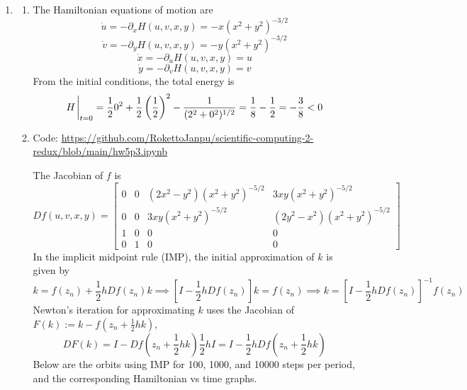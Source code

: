 \documentclass{article}
\newcommand{\br}[1]{\left(#1\right)}
\newcommand{\sbr}[1]{\left[#1\right]}
\newcommand{\m}[2][b]{\begin{#1matrix}#2\end{#1matrix}}
\newcommand{\inv}{^{-1}}
\newcommand{\imp}{\implies}
\newcommand{\ptl}{\partial}
\begin{document}
\begin{enumerate}
\begin{enumerate}
\end{enumerate}



\item

\begin{enumerate}[label=(\alph*)]
	
	\item The Hamiltonian equations of motion are
	$$\dot u = -\ptl_xH(u,v,x,y) = -x(x^2+y^2)^{-3/2}$$
	$$\dot v = -\ptl_yH(u,v,x,y) = -y(x^2+y^2)^{-3/2}$$
	$$\dot x = -\ptl_uH(u,v,x,y) = u$$
	$$\dot y = -\ptl_vH(u,v,x,y) = v$$
	From the initial conditions, the total energy is
	$$H\eval_{t=0} = \frac120^2 + \frac12\br{\frac12}^2 - \frac{1}{(2^2+0^2)^{1/2}} = \frac18 - \frac12 = -\frac38 < 0$$
	
	
	\item Code: \url{https://github.com/RokettoJanpu/scientific-computing-2-redux/blob/main/hw5p3.ipynb}
	
	The Jacobian of $f$ is
	$$Df(u,v,x,y) = \m{
		0 & 0 & (2x^2 - y^2)(x^2 + y^2)^{-5/2} & 3xy(x^2 + y^2)^{-5/2} \\
		0 & 0 & 3xy(x^2 + y^2)^{-5/2} & (2y^2 - x^2)(x^2 + y^2)^{-5/2} \\
		1 & 0 & 0 & 0\\
		0 & 1 & 0 & 0
	}$$
	In the implicit midpoint rule (IMP), the initial approximation of $k$ is given by
	$$k = f(z_n) + \frac12hDf(z_n)k
	\imp \sbr{I - \frac12hDf(z_n)}k = f(z_n)
	\imp k = \sbr{I - \frac12hDf(z_n)}\inv f(z_n)$$
	Newton's iteration for approximating $k$ uses the Jacobian of $F(k):=k-f(z_n+\frac12hk)$,
	$$DF(k) = I - Df\br{z_n + \frac12hk}\frac12hI = I - \frac12hDf\br{z_n + \frac12hk}$$
	Below are the orbits using IMP for 100, 1000, and 10000 steps per period, and the corresponding Hamiltonian vs time graphs.
	

\end{enumerate}
\end{enumerate}
\end{document}
